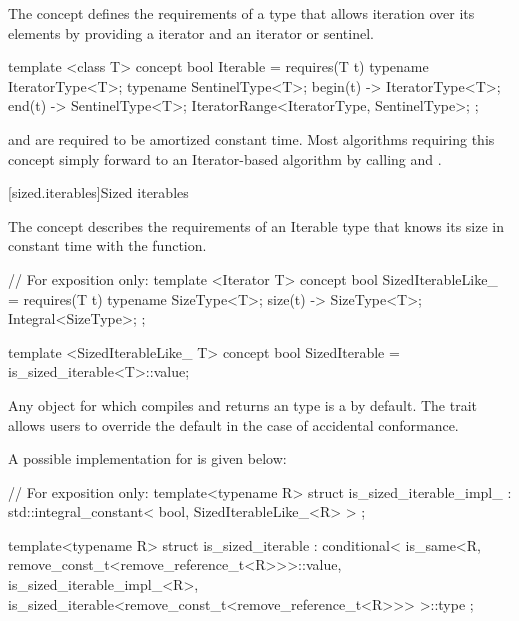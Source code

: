 \begin{addedblock}
\pnum
The  concept defines the requirements of a type that allows
iteration over its elements by providing a  iterator and an
 iterator or sentinel.

\begin{codeblock}
template <class T>
concept bool Iterable =
  requires(T t) {
    typename IteratorType<T>;
    typename SentinelType<T>;
    { begin(t) } -> IteratorType<T>;
    { end(t) } -> SentinelType<T>;
    IteratorRange<IteratorType, SentinelType>;
  };
\end{codeblock}

 and  are required to be amortized constant time.
\enternote Most algorithms requiring this concept simply forward to an
Iterator-based algorithm by calling  and . \exitnote

[sized.iterables]{Sized iterables}

\pnum
The  concept describes the requirements of an Iterable
type that knows its size in constant time with the  function.

\begin{codeblock}
// For exposition only:
template <Iterator T>
concept bool SizedIterableLike_ =
  requires(T t) {
    typename SizeType<T>;
    { size(t) } -> SizeType<T>;
    Integral<SizeType>;
  };

template <SizedIterableLike_ T>
concept bool SizedIterable =
  is_sized_iterable<T>::value;
\end{codeblock}

\pnum
Any  object  for which  compiles and
returns an  type is a  by default. The
 trait allows users to override the default in the
case of accidental conformance.

\enternote
A possible implementation for  is given below:

\begin{codeblock}
// For exposition only:
template<typename R>
struct is_sized_iterable_impl_
  : std::integral_constant< bool, SizedIterableLike_<R> >
{};

template<typename R>
struct is_sized_iterable
  : conditional<
        is_same<R, remove_const_t<remove_reference_t<R>>>::value,
        is_sized_iterable_impl_<R>,
        is_sized_iterable<remove_const_t<remove_reference_t<R>>>
    >::type
{};
\end{codeblock}
\exitnote


\end{addedblock}
